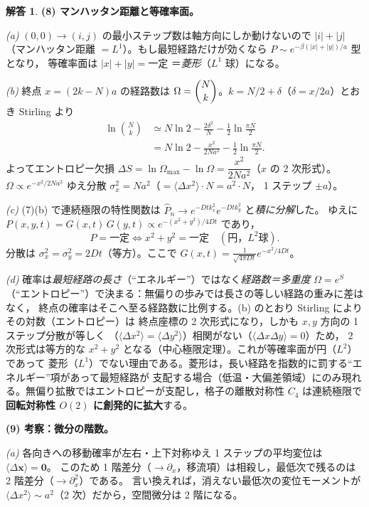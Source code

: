 \documentclass[dvipdfmx, uplatex]{jsarticle}
\newcommand{\bx}{\bm{x}}
\theoremstyle{definition}
\newtheorem*{sol}{解答}
\begin{document}
\begin{sol}
\par\smallskip
\textbf{(8) マンハッタン距離と等確率面。}

\textit{(a)} $(0,0)\to(i,j)$ の最小ステップ数は軸方向にしか動けないので $\boxed{|i|+|j|}$
（マンハッタン距離 $=L^1$）。もし最短経路だけが効くなら $P\sim e^{-\beta(|x|+|y|)/a}$ 型となり，
等確率面は $\boxed{|x|+|y|=\text{一定}}$ ＝\emph{菱形}（$L^1$ 球）になる。

\textit{(b)} 終点 $x=(2k-N)a$ の経路数は $\Omega=\dbinom{N}{k}$。$k=N/2+\delta$（$\delta=x/2a$）とおき
Stirling より
\begin{align*}
    \ln\binom{N}{k}&\simeq N\ln2-\frac{2\delta^2}{N}-\frac12\ln\frac{\pi N}{2}\\
    &=N\ln2-\frac{x^2}{2Na^2}-\frac12\ln\frac{\pi N}{2}.
\end{align*}
よってエントロピー欠損 $\boxed{\Delta S=\ln\Omega_{\max}-\ln\Omega=\dfrac{x^2}{2Na^2}}$（$x$ の 2 次形式）。
$\Omega\propto e^{-x^2/2Na^2}$ ゆえ分散 $\boxed{\sigma_x^2=Na^2}$（$=\langle\Delta x^2\rangle\cdot N=a^2\cdot N$，
1 ステップ $\pm a$）。

\textit{(c)} (7)(b) で連続極限の特性関数は $\hat P_n\to e^{-Dt k_x^2}e^{-Dt k_y^2}$ と\emph{積に分解}した。
ゆえに $P(x,y,t)=G(x,t)\,G(y,t)\propto e^{-(x^2+y^2)/4Dt}$ であり，
\[
    P=\text{一定}\iff\boxed{x^2+y^2=\text{一定}}\quad(\text{円，}L^2\text{球}).
\]
分散は $\boxed{\sigma_x^2=\sigma_y^2=2Dt}$（等方）。ここで $G(x,t)=\frac{1}{\sqrt{4\pi Dt}}e^{-x^2/4Dt}$。

\textit{(d)} 確率は\emph{最短経路の長さ}（``エネルギー''）ではなく\emph{経路数＝多重度}
$\Omega=e^{S}$（``エントロピー''）で決まる：無偏りの歩みでは長さの等しい経路の重みに差はなく，
終点の確率はそこへ至る経路数に比例する。(b) のとおり Stirling によりその対数（エントロピー）は
終点座標の 2 次形式になり，しかも $x,y$ 方向の 1 ステップ分散が等しく
（$\langle\Delta x^2\rangle=\langle\Delta y^2\rangle$）相関がない（$\langle\Delta x\Delta y\rangle=0$）ため，
2 次形式は等方的な $x^2+y^2$ となる（中心極限定理）。これが等確率面が円（$L^2$）であって
菱形（$L^1$）でない理由である。菱形は，長い経路を指数的に罰する``エネルギー''項があって最短経路が
支配する場合（低温・大偏差領域）にのみ現れる。無偏り拡散ではエントロピーが支配し，格子の離散対称性
$C_4$ は連続極限で\textbf{回転対称性 $O(2)$ に創発的に拡大}する。

\par\smallskip
\textbf{(9) 考察：微分の階数。}

\textit{(a)} 各向きへの移動確率が左右・上下対称ゆえ 1 ステップの平均変位は $\langle\Delta\bx\rangle=\bm0$。
このため 1 階差分（$\to\partial_x$，移流項）は相殺し，最低次で残るのは 2 階差分（$\to\partial_x^2$）である。
言い換えれば，消えない最低次の変位モーメントが $\langle\Delta x^2\rangle\sim a^2$（2 次）だから，空間微分は 2 階になる。


\end{sol}
\end{document}
